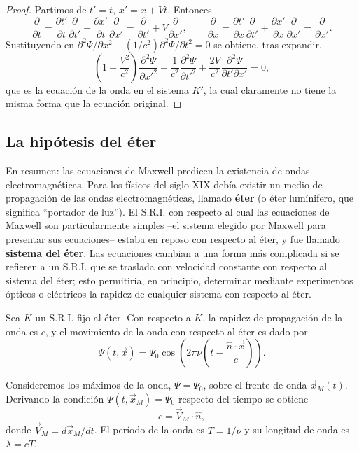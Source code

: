 \begin{proof}
Partimos de $t'=t$, $x'=x+Vt$. Entonces
\[
\frac{\partial}{\partial t} = \frac{\partial t'}{\partial t}\frac{
\partial}{\partial t'} + \frac{\partial x'}{\partial t}\frac{\partial}
{\partial x'} = \frac{\partial}{\partial t'} + V\frac{\partial}{\partial
x'}, \qquad \frac{\partial}{\partial x} = \frac{\partial t'}{\partial
x}\frac{\partial}{\partial t'} + \frac{\partial x'}{\partial x}\frac{
\partial}{\partial x'} = \frac{\partial}{\partial x'}.
\]
Sustituyendo en $\partial^2\Psi/\partial x^2 - (1/c^2)\partial^2\Psi/
\partial t^2=0$ se obtiene, tras expandir,
\[
\left(1-\frac{V^2}{c^2}\right)\frac{\partial^2\Psi}{\partial x'^2} -
\frac{1}{c^2}\frac{\partial^2\Psi}{\partial t'^2} + \frac{2V}{c^2}
\frac{\partial^2\Psi}{\partial t'\partial x'} = 0,
\]
que es la ecuación de la onda en el sistema $K'$, la cual claramente no
tiene la misma forma que la ecuación original. \qedhere
\end{proof}

\subsection{La hipótesis del éter}

En resumen: las ecuaciones de Maxwell predicen la existencia de ondas
electromagnéticas. Para los físicos del siglo XIX debía existir un medio
de propagación de las ondas electromagnéticas, llamado \textbf{éter} (o
éter lumínifero, que significa ``portador de luz''). El S.R.I. con
respecto al cual las ecuaciones de Maxwell son particularmente simples
--el sistema elegido por Maxwell para presentar sus ecuaciones-- estaba
en reposo con respecto al éter, y fue llamado \textbf{sistema del éter}.
Las ecuaciones cambian a una forma más complicada si se refieren a un
S.R.I. que se traslada con velocidad constante con respecto al sistema
del éter; esto permitiría, en principio, determinar mediante
experimentos ópticos o eléctricos la rapidez de cualquier sistema con
respecto al éter.

Sea $K$ un S.R.I. fijo al éter. Con respecto a $K$, la rapidez de
propagación de la onda es $c$, y el movimiento de la onda con respecto
al éter es dado por
\[
\Psi(t,\vec x) = \Psi_0\cos\!\left(2\pi\nu\left(t-\frac{\hat n\cdot\vec
x}{c}\right)\right).
\]

\begin{proposicionc}
Consideremos los máximos de la onda, $\Psi=\Psi_0$, sobre el frente de
onda $\vec x_M(t)$. Derivando la condición $\Psi(t,\vec x_M)=\Psi_0$
respecto del tiempo se obtiene
\[
c = \vec V_M\cdot\hat n,
\]
donde $\vec V_M=d\vec x_M/dt$. El período de la onda es $T=1/\nu$ y su
longitud de onda es $\lambda=cT$.
\end{proposicionc}

